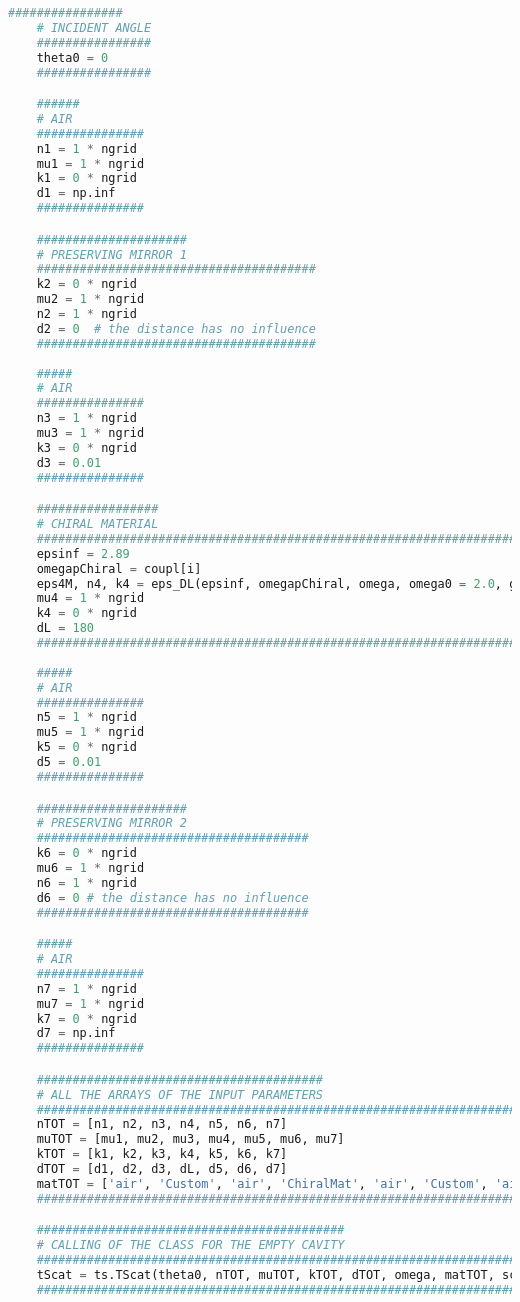 \documentclass[showpacs,aps,prl,onecolumn,superscriptaddress]{revtex4-1}
\begin{document}
\begin{lstlisting}[language=Python, caption=Script for Figure 15]
    ################
    # INCIDENT ANGLE
    ################
    theta0 = 0
    ################

    ######
    # AIR
    ###############
    n1 = 1 * ngrid
    mu1 = 1 * ngrid
    k1 = 0 * ngrid
    d1 = np.inf
    ###############

    #####################
    # PRESERVING MIRROR 1
    #######################################
    k2 = 0 * ngrid
    mu2 = 1 * ngrid
    n2 = 1 * ngrid
    d2 = 0  # the distance has no influence
    #######################################
    
    #####
    # AIR 
    ###############
    n3 = 1 * ngrid
    mu3 = 1 * ngrid
    k3 = 0 * ngrid
    d3 = 0.01
    ###############

    #################
    # CHIRAL MATERIAL
    #########################################################################################
    epsinf = 2.89
    omegapChiral = coupl[i]
    eps4M, n4, k4 = eps_DL(epsinf, omegapChiral, omega, omega0 = 2.0, gamma = 0.05, k0 = 0.0)
    mu4 = 1 * ngrid
    k4 = 0 * ngrid
    dL = 180
    ######################################################################################### 
       
    #####
    # AIR 
    ###############
    n5 = 1 * ngrid
    mu5 = 1 * ngrid
    k5 = 0 * ngrid
    d5 = 0.01
    ###############

    #####################
    # PRESERVING MIRROR 2
    ######################################
    k6 = 0 * ngrid
    mu6 = 1 * ngrid
    n6 = 1 * ngrid
    d6 = 0 # the distance has no influence
    ######################################  

    #####
    # AIR
    ###############
    n7 = 1 * ngrid
    mu7 = 1 * ngrid
    k7 = 0 * ngrid
    d7 = np.inf
    ###############

    ########################################
    # ALL THE ARRAYS OF THE INPUT PARAMETERS
    #############################################################################
    nTOT = [n1, n2, n3, n4, n5, n6, n7] 
    muTOT = [mu1, mu2, mu3, mu4, mu5, mu6, mu7]
    kTOT = [k1, k2, k3, k4, k5, k6, k7] 
    dTOT = [d1, d2, d3, dL, d5, d6, d7] 
    matTOT = ['air', 'Custom', 'air', 'ChiralMat', 'air', 'Custom', 'air']
    #############################################################################

    ###########################################
    # CALLING OF THE CLASS FOR THE EMPTY CAVITY
    #########################################################################
    tScat = ts.TScat(theta0, nTOT, muTOT, kTOT, dTOT, omega, matTOT, scatTOT)  
    #########################################################################
    

\end{lstlisting}
\end{document}
